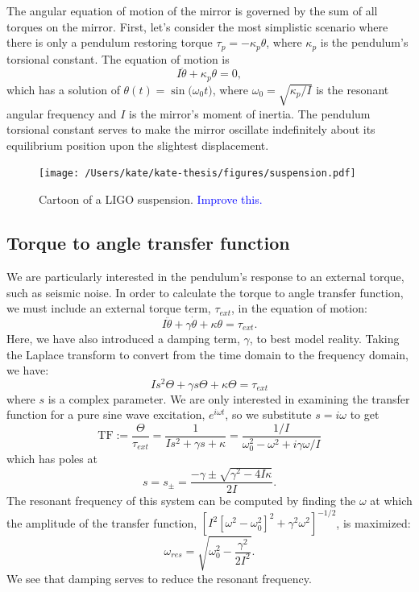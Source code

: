 The angular equation of motion of the mirror is governed by the sum of
all torques on the mirror. First, let's consider the most simplistic scenario where
there is only a pendulum restoring torque $\tau_p=-\kappa_p \theta$,
where $\kappa_p$ is the pendulum's torsional constant. The equation of
motion is
\begin{equation}
I \ddot{\theta} + \kappa_p \theta = 0,
\end{equation}
which has a solution of $\theta(t) = \sin({\omega_0 t)}$, where
$\omega_0 = \sqrt{\kappa_p/I}$ is the resonant angular frequency and
$I$ is the mirror's moment of inertia. The pendulum torsional constant
serves to make the mirror oscillate indefinitely about its equilibrium
position upon the slightest displacement.

\begin{figure}
\begin{centering}
\texttt{[image: /Users/kate/kate-thesis/figures/suspension.pdf]}
\caption{Cartoon of a LIGO suspension. \textcolor{blue}{Improve this.}}
\label{fig:suspension}
\end{centering}
\end{figure}


\subsection{Torque to angle transfer function}
We are particularly interested in the pendulum's response to an
external torque, such as seismic noise. In order to calculate the
torque to angle transfer function, we must include an external torque
term, $\tau_{ext}$, in the equation of motion:
\begin{equation}
I \ddot{\theta} + \gamma \dot{\theta} + \kappa \theta = \tau_{ext}.
\label{eq:eqmotion}
\end{equation}
Here, we have also introduced a damping term, $\gamma$, to best model
reality. Taking the Laplace transform to convert from the time domain
to the frequency domain, we have:
\begin{equation}
I s^2 \Theta + \gamma s \Theta + \kappa \Theta = \tau_{ext}
\end{equation}
where $s$ is a complex parameter. We are only interested in examining
the transfer function for a pure sine wave excitation, $e^{i\omega
  t}$, so we substitute $s=i\omega$ to get
\begin{equation}
\mathrm{TF} := \frac{\Theta}{\tau_{ext}} = \frac{1}{I s^2 + \gamma s +
  \kappa} = \frac{1/I}{\omega_0^2  - \omega^2 + i \gamma \omega / I}
\label{eq:TF}
\end{equation}
which has poles at 
\begin{equation}
s = s_\pm = \frac{-\gamma \pm \sqrt{\gamma^2 - 4 I \kappa}}{2 I}.
\label{eq:TFpoles}
\end{equation}
The resonant frequency of this system can be computed by finding the
$\omega$ at which the amplitude of the transfer function, $[I^2
[\omega^2 - \omega_0^2]^2 + \gamma^2 \omega^2]^{-1/2}$, is maximized:
\begin{equation}
\omega_{res} = \sqrt{\omega_0^2 - \frac{\gamma^2}{2I^2}}.
\end{equation}
We see that damping serves to reduce the resonant frequency.

